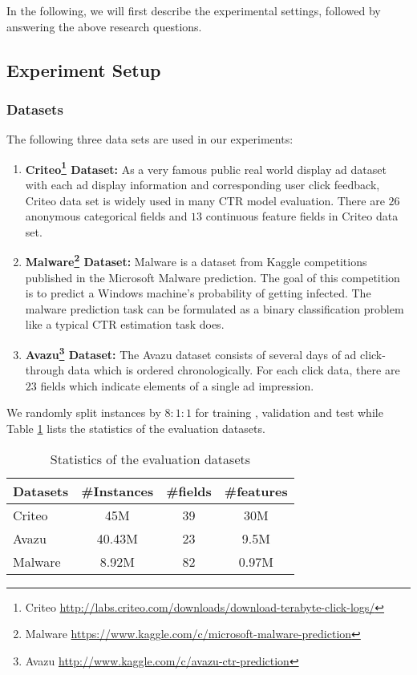 \documentclass[sigconf]{acmart}
\begin{document}
In the following, we will  first describe the experimental settings, followed by answering the above research questions.

\subsection{Experiment Setup}

\subsubsection{Datasets}


The following three data sets are used in our experiments:

\begin{enumerate}
  \item \textbf{Criteo\footnote{Criteo \url{http://labs.criteo.com/downloads/download-terabyte-click-logs/}} Dataset:}
  As a very famous public real world display ad dataset with each ad display information and corresponding user click feedback, Criteo data set is widely used in many CTR model evaluation. There are $26$ anonymous categorical fields and $13$ continuous feature fields in Criteo data set.

  \item \textbf{Malware\footnote{Malware \url{https://www.kaggle.com/c/microsoft-malware-prediction}} Dataset:}
  Malware is a dataset from Kaggle competitions published in the Microsoft Malware prediction. The goal of this competition is to predict a Windows machine's probability of getting infected. The malware prediction task can be formulated as a binary classification problem like a typical CTR estimation task does.

  \item \textbf{Avazu\footnote{Avazu \url{http://www.kaggle.com/c/avazu-ctr-prediction}} Dataset:}
    The Avazu dataset consists of several days of ad click- through data which is ordered chronologically. For each click data, there are $23$ fields which indicate elements of a single ad impression.
\end{enumerate}




We randomly split instances by $8:1:1$ for training , validation and test while Table \ref{tab:datasets} lists the statistics of the evaluation datasets.

\begin{table}[h]
  \setlength{\abovecaptionskip}{1pt}
\centering
\caption{Statistics of the evaluation datasets}
\begin{tabular}{lccc}
\toprule
Datasets  & \#Instances & \#fields & \#features \\
\midrule
Criteo       & 45M  & 39 & 30M     \\
Avazu       & 40.43M  & 23 & 9.5M     \\
Malware     & 8.92M  & 82 & 0.97M \\
\bottomrule
\end{tabular}
\label{tab:datasets}
\end{table}
\end{document}
